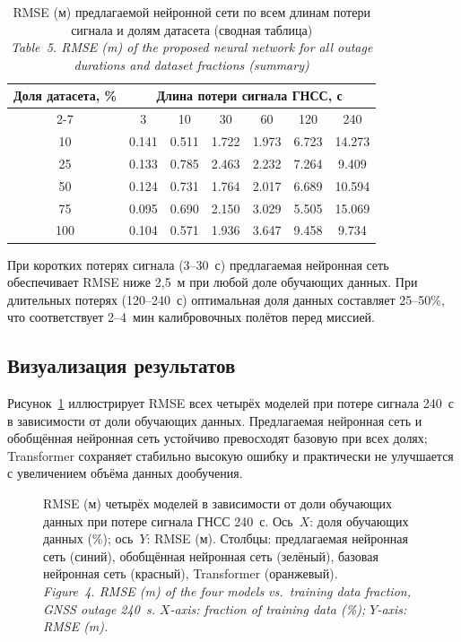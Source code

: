 \begin{table}[htbp]
	\centering
	\caption{RMSE (м) предлагаемой нейронной сети по всем длинам потери сигнала и долям датасета (сводная таблица)\\
		\textit{Table~5. RMSE (m) of the proposed neural network for all outage durations and dataset fractions (summary)}}
	\label{tab:summary_df}
	\begin{tabular}{c *{6}{c}}
		\toprule
		\multirow{2}{*}{Доля датасета, \%} &
		\multicolumn{6}{c}{Длина потери сигнала ГНСС, с} \\
		\cmidrule(lr){2-7}
		& {3} & {10} & {30} & {60} & {120} & {240} \\
		\midrule
		10  & \num{0,141} & \num{0,511} & \num{1,722} & \num{1,973} & \num{6,723}  & \num{14,273} \\
		25  & \num{0,133} & \num{0,785} & \num{2,463} & \num{2,232} & \num{7,264}  & \num{9,409}  \\
		50  & \num{0,124} & \num{0,731} & \num{1,764} & \num{2,017} & \num{6,689}  & \num{10,594} \\
		75  & \num{0,095} & \num{0,690} & \num{2,150} & \num{3,029} & \num{5,505}  & \num{15,069} \\
		100 & \num{0,104} & \num{0,571} & \num{1,936} & \num{3,647} & \num{9,458}  & \num{9,734}  \\
		\bottomrule
	\end{tabular}
\end{table}

При коротких потерях сигнала (3--30~с) предлагаемая нейронная сеть обеспечивает
RMSE ниже 2{,}5~м при любой доле обучающих данных.
При длительных потерях (120--240~с) оптимальная доля данных составляет 25--50\%,
что соответствует 2--4~мин калибровочных полётов перед миссией.

\subsection{Визуализация результатов}

Рисунок~\ref{fig:rmse_plot} иллюстрирует RMSE всех четырёх моделей при
потере сигнала 240~с в зависимости от доли обучающих данных.
Предлагаемая нейронная сеть и обобщённая нейронная сеть устойчиво превосходят
базовую при всех долях; Transformer сохраняет стабильно высокую ошибку и
практически не улучшается с увеличением объёма данных дообучения.

\begin{figure}[htbp]
	\centering
	\resizebox{0.92\linewidth}{!}{}
	\caption{RMSE (м) четырёх моделей в зависимости от доли обучающих
		данных при потере сигнала ГНСС 240~с.
		Ось~$X$: доля обучающих данных (\%);
		ось~$Y$: RMSE (м).
		Столбцы: предлагаемая нейронная сеть (синий), обобщённая нейронная сеть (зелёный), базовая нейронная сеть (красный), Transformer (оранжевый).\\
		\textit{Figure~4. RMSE (m) of the four models vs.\ training data fraction,
			GNSS outage 240~s. $X$-axis: fraction of training data (\%);
			$Y$-axis: RMSE (m).}}
	\label{fig:rmse_plot}
\end{figure}

